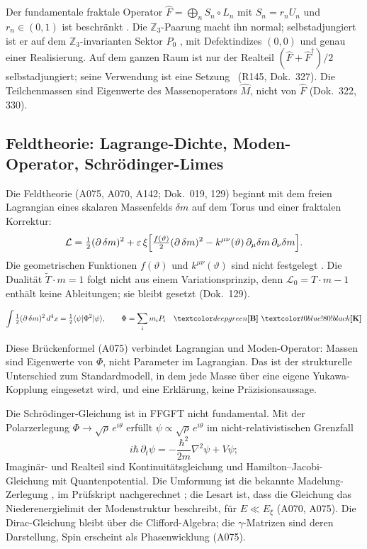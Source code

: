 Der fundamentale fraktale Operator $\hat F=\bigoplus_n S_n\circ L_n$ mit $S_n=r_nU_n$ und
$r_n\in(0,1)$ ist beschränkt \BM. Die $\mathbb Z_3$-Paarung macht ihn normal; selbstadjungiert
ist er auf dem $\mathbb Z_3$-invarianten Sektor $P_0$ \BM, mit Defektindizes $(0,0)$ und genau
einer Realisierung. Auf dem ganzen Raum ist nur der Realteil $(\hat F+\hat F^\dagger)/2$
selbstadjungiert; seine Verwendung ist eine Setzung \SM\ (R145, Dok.~327). Die Teilchenmassen
sind Eigenwerte des Massenoperators $\hat M$, nicht von $\hat F$ (Dok.~322, 330).

\subsection{Feldtheorie: Lagrange-Dichte, Moden-Operator, Schrödinger-Limes}

Die Feldtheorie (A075, A070, A142; Dok.~019, 129) beginnt mit dem freien Lagrangian eines
skalaren Massenfelds $\delta m$ auf dem Torus und einer fraktalen Korrektur:
\begin{equation}
  \mathcal L=\tfrac12(\partial\,\delta m)^2
  +\varepsilon\,\xi\Bigl[\tfrac{f(\vartheta)}{2}(\partial\,\delta m)^2
  -k^{\mu\nu}(\vartheta)\,\partial_\mu\delta m\,\partial_\nu\delta m\Bigr].
\end{equation}
Die geometrischen Funktionen $f(\vartheta)$ und $k^{\mu\nu}(\vartheta)$ sind nicht festgelegt \SM.
Die Dualität $\tilde T\cdot m=1$ folgt nicht aus einem Variationsprinzip, denn $\mathcal L_0=T\cdot
m-1$ enthält keine Ableitungen; sie bleibt gesetzt (Dok.~129).

\begin{ffkern}
\begin{equation}
  \int\tfrac12(\partial\,\delta m)^2\,d^4x=\tfrac12\langle\psi|\Phi^2|\psi\rangle,
  \qquad \Phi=\sum_i m_i P_i \quad\BM\ \KM
\end{equation}
\end{ffkern}%
Diese Brückenformel (A075) verbindet Lagrangian und Moden-Operator: Massen sind Eigenwerte von
$\Phi$, nicht Parameter im Lagrangian. Das ist der strukturelle Unterschied zum Standardmodell,
in dem jede Masse über eine eigene Yukawa-Kopplung eingesetzt wird, und eine Erklärung, keine
Präzisionsaussage.

Die Schrödinger-Gleichung ist in FFGFT nicht fundamental. Mit der Polarzerlegung
$\Phi\to\sqrt\rho\,e^{i\theta}$ erfüllt $\psi\propto\sqrt\rho\,e^{i\theta}$ im
nicht-relativistischen Grenzfall
\begin{equation}
  i\hbar\,\partial_t\psi=-\frac{\hbar^2}{2m}\nabla^2\psi+V\psi ;
\end{equation}
Imaginär- und Realteil sind Kontinuitätsgleichung und Hamilton--Jacobi-Gleichung mit
Quantenpotential. Die Umformung ist die bekannte Madelung-Zerlegung \QM, im Prüfskript
nachgerechnet \KM; die Lesart ist, dass die Gleichung das Niederenergielimit der Modenstruktur
beschreibt, für $E\ll E_\xi$ (A070, A075). Die Dirac-Gleichung bleibt über die
Clifford-Algebra; die $\gamma$-Matrizen sind deren Darstellung, Spin erscheint als
Phasenwicklung (A075).


